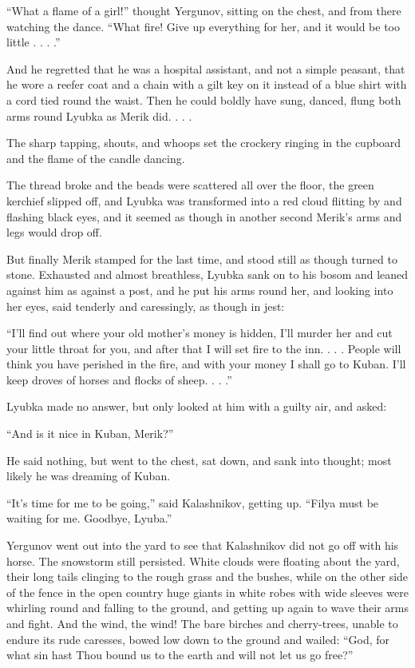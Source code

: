 “What a flame of a girl!” thought Yergunov, sitting on the chest, and
from there watching the dance. “What fire! Give up everything for her,
and it would be too little . . . .”

And he regretted that he was a hospital assistant, and not a simple
peasant, that he wore a reefer coat and a chain with a gilt key on it
instead of a blue shirt with a cord tied round the waist. Then he could
boldly have sung, danced, flung both arms round Lyubka as Merik did. . .
.

The sharp tapping, shouts, and whoops set the crockery ringing in the
cupboard and the flame of the candle dancing.

The thread broke and the beads were scattered all over the floor, the
green kerchief slipped off, and Lyubka was transformed into a red cloud
flitting by and flashing black eyes, and it seemed as though in another
second Merik’s arms and legs would drop off.

But finally Merik stamped for the last time, and stood still as though
turned to stone. Exhausted and almost breathless, Lyubka sank on to his
bosom and leaned against him as against a post, and he put his arms
round her, and looking into her eyes, said tenderly and caressingly, as
though in jest:

“I’ll find out where your old mother’s money is hidden, I’ll murder her
and cut your little throat for you, and after that I will set fire to
the inn. . . . People will think you have perished in the fire, and with
your money I shall go to Kuban. I’ll keep droves of horses and flocks of
sheep. . . .”

Lyubka made no answer, but only looked at him with a guilty air, and
asked:

“And is it nice in Kuban, Merik?”

He said nothing, but went to the chest, sat down, and sank into thought;
most likely he was dreaming of Kuban.

“It’s time for me to be going,” said Kalashnikov, getting up. “Filya
must be waiting for me. Goodbye, Lyuba.”

Yergunov went out into the yard to see that Kalashnikov did not go off
with his horse. The snowstorm still persisted. White clouds were
floating about the yard, their long tails clinging to the rough grass
and the bushes, while on the other side of the fence in the open country
huge giants in white robes with wide sleeves were whirling round and
falling to the ground, and getting up again to wave their arms and
fight. And the wind, the wind! The bare birches and cherry-trees, unable
to endure its rude caresses, bowed low down to the ground and wailed:
“God, for what sin hast Thou bound us to the earth and will not let us
go free?”

